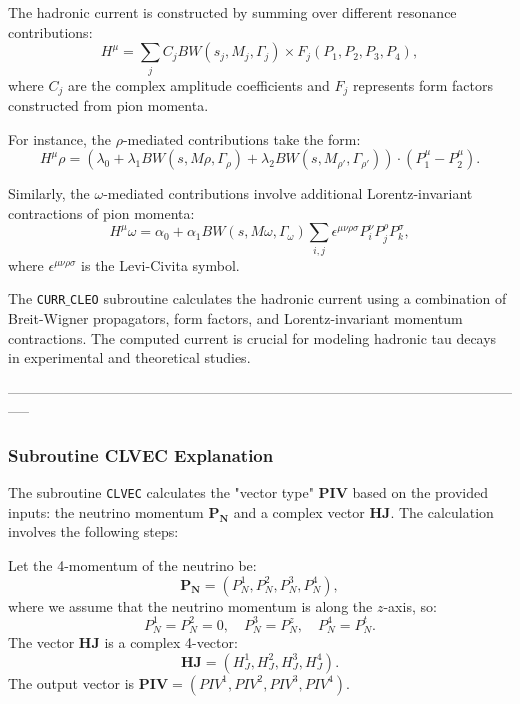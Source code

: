 \documentclass[12pt]{article}
\begin{document}
The hadronic current is constructed by summing over different resonance contributions:
\begin{equation}
H^{\mu} = \sum_{j} C_j BW(s_j, M_j, \Gamma_j) \times F_j(P_1, P_2, P_3, P_4),
\end{equation}
where $C_j$ are the complex amplitude coefficients and $F_j$ represents form factors constructed from pion momenta.

For instance, the $\rho$-mediated contributions take the form:
\begin{equation}
H^{\mu}{\rho} = (\lambda_0 + \lambda_1 BW(s, M\rho, \Gamma_\rho) + \lambda_2 BW(s, M_{\rho'}, \Gamma_{\rho'}) ) \cdot (P_1^{\mu} - P_2^{\mu}).
\end{equation}

Similarly, the $\omega$-mediated contributions involve additional Lorentz-invariant contractions of pion momenta:
\begin{equation}
H^{\mu}{\omega} = \alpha_0 + \alpha_1 BW(s, M\omega, \Gamma_\omega) \sum_{i,j} \epsilon^{\mu \nu \rho \sigma} P_i^{\nu} P_j^{\rho} P_k^{\sigma},
\end{equation}
where $\epsilon^{\mu \nu \rho \sigma}$ is the Levi-Civita symbol.



The \texttt{CURR$\_$CLEO} subroutine calculates the hadronic current using a combination of Breit-Wigner propagators, form factors, and Lorentz-invariant momentum contractions. The computed current is crucial for modeling hadronic tau decays in experimental and theoretical studies.


-----------------------------------------------------------------------------------------------------------------\\


\subsubsection*{Subroutine CLVEC Explanation}

The subroutine \texttt{CLVEC} calculates the "vector type" $\mathbf{PIV}$ based on the provided inputs: the neutrino momentum $\mathbf{P_N}$ and a complex vector $\mathbf{HJ}$. The calculation involves the following steps:

Let the 4-momentum of the neutrino be:
\[
\mathbf{P_N} = (P_N^1, P_N^2, P_N^3, P_N^4),
\]
where we assume that the neutrino momentum is along the $z$-axis, so:
\[
P_N^1 = P_N^2 = 0, \quad P_N^3 = P_N^z, \quad P_N^4 = P_N^t.
\]
The vector $\mathbf{HJ}$ is a complex 4-vector:
\[
\mathbf{HJ} = (H_J^1, H_J^2, H_J^3, H_J^4).
\]
The output vector is $\mathbf{PIV} = (PIV^1, PIV^2, PIV^3, PIV^4)$.
\end{document}
